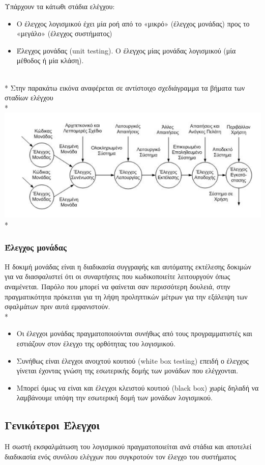 \documentclass[a4paper, 11pt]{article}
\begin{document}
{{Υπάρχουν τα κάτωθι στάδια ελέγχου:
\begin{itemize}
\item Ο έλεγχος λογισμικού έχει μία ροή από το «μικρό» (έλεγχος
μονάδας) προς το «μεγάλο» (έλεγχος συστήματος)
\item Έλεγχος μονάδας (\textlatin{unit testing}). Ο έλεγχος μίας μονάδας
λογισμικού (μία μέθοδος ή μία κλάση).
\end{itemize}
\\*
Στην παρακάτω εικόνα αναφέρεται σε αντίστοιχο σχεδιάγραμμα τα βήματα των σταδίων ελέγχου\\*
\includegraphics{images/control.png}\\*
\subsubsection{Έλεγχος μονάδας}
Η δοκιμή μονάδας είναι η διαδικασία συγγραφής και αυτόματης εκτέλεσης δοκιμών για να διασφαλιστεί ότι οι συναρτήσεις που κωδικοποιείτε λειτουργούν όπως αναμένεται. Παρόλο που μπορεί να φαίνεται σαν περισσότερη δουλειά, στην πραγματικότητα πρόκειται για τη λήψη προληπτικών μέτρων για την εξάλειψη των σφαλμάτων πριν αυτά εμφανιστούν.\\*

\begin{itemize}
\item Οι έλεγχοι μονάδας πραγματοποιούνται συνήθως από τους
προγραμματιστές και εστιάζουν στον έλεγχο της ορθότητας του
λογισμικού.
\item Συνήθως είναι έλεγχοι ανοιχτού κουτιού (white box testing) επειδή
ο έλεγχος γίνεται έχοντας γνώση της εσωτερικής δομής των
μονάδων που ελέγχονται.
\item Μπορεί όμως να είναι και έλεγχοι κλειστού κουτιού (black box)
χωρίς δηλαδή να λαμβάνουμε υπόψη την εσωτερική δομή των
μονάδων λογισμικού.
\end{itemize}

\subsection{Γενικότεροι Έλεγχοι}
Η σωστή εκσφαλμάτωση του λογισμικού πραγματοποιείται ανά στάδια και αποτελεί διαδικασία ενός συνόλου ελέγχων που συγκροτούν τον έλεγχο του συστήματος
}}
\end{document}
